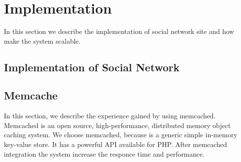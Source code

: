 \chapter{Implementation}

In this section we describe the implementation of social network site
and how make the system scalable.

\section{Implementation of Social Network}

\section{Memcache}
In this section, we describe the experience gained by using memcached\cite{memcache_url}. Memcached is an open source, high-performance, distributed memory object caching system. We choose memcached, because is a generic simple in-memory key-value store. It has a powerful API available for PHP. After memcached integration the system increase the responce time and performance.


